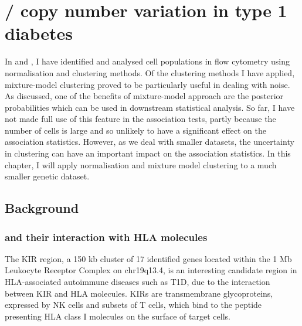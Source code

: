 %

\chapter[KIR3DL1/KIR3DS1 copy number variation in type 1 diabetes]{ \label{chapter:kir} \protect{}/\protect{} copy number variation in type 1 diabetes }


In  and , I have identified and analysed cell populations in flow cytometry using normalisation and clustering methods.
Of the clustering methods I have applied, mixture-model clustering proved to be particularly useful in dealing with noise.
As discussed, one of the benefits of mixture-model approach are the posterior probabilities which can be used in downstream statistical analysis.
So far, I have not made full use of this feature in the association tests, partly because the number of cells is large and so unlikely to have
a significant effect on the association statistics.
However, as we deal with smaller datasets, the uncertainty in clustering can have an important impact on the association statistics.
In this chapter, I will apply normalisation and mixture model clustering to a much smaller genetic dataset.


\section{Background}

\subsection{ and their interaction with \acrlong{HLA} molecules}

The \gls{KIR} region, a 150 kb cluster of 17 identified genes located within the 1 Mb Leukocyte Receptor Complex on chr19q13.4,
is an interesting candidate region in HLA-associated autoimmune diseases such as \gls{T1D}, due to the interaction between \gls{KIR} and \gls{HLA} molecules.
\Glspl{KIR} are transmembrane glycoproteins, expressed by \gls{NK} cells and subsets of T cells,
which bind to the peptide presenting HLA class I molecules on the surface of target cells.

